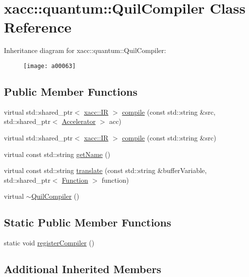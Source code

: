 \hypertarget{a00063}{}\section{xacc\+:\+:quantum\+:\+:Quil\+Compiler Class Reference}
\label{a00063}
Inheritance diagram for xacc\+:\+:quantum\+:\+:Quil\+Compiler\+:\begin{figure}[H]
\begin{center}
\leavevmode
\texttt{[image: a00063]}
\end{center}
\end{figure}
\subsection*{Public Member Functions}
\begin{DoxyCompactItemize}
\item 
virtual std\+::shared\+\_\+ptr$<$ \hyperlink{a00051}{xacc\+::\+IR} $>$ \hyperlink{a00063_a2421482415ca4e09963ea4ecddff8100}{compile} (const std\+::string \&src, std\+::shared\+\_\+ptr$<$ \hyperlink{a00011}{Accelerator} $>$ acc)
\item 
virtual std\+::shared\+\_\+ptr$<$ \hyperlink{a00051}{xacc\+::\+IR} $>$ \hyperlink{a00063_adf4d321ecb0df3fa7728999f941c83b2}{compile} (const std\+::string \&src)
\item 
virtual const std\+::string \hyperlink{a00063_ae7d52140b6dd52730edc6e38ae48f437}{get\+Name} ()
\item 
virtual const std\+::string \hyperlink{a00063_a66ca00bbb1f30e7bc6dd86b1e267b93b}{translate} (const std\+::string \&buffer\+Variable, std\+::shared\+\_\+ptr$<$ \hyperlink{a00039}{Function} $>$ function)
\item 
virtual \hyperlink{a00063_a0866a9f695f28c90ac1f4754374f3bfe}{$\sim$\+Quil\+Compiler} ()
\end{DoxyCompactItemize}
\subsection*{Static Public Member Functions}
\begin{DoxyCompactItemize}
\item 
static void \hyperlink{a00063_aaec99a14bede717bf02a0f65af2a3c69}{register\+Compiler} ()
\end{DoxyCompactItemize}
\subsection*{Additional Inherited Members}



